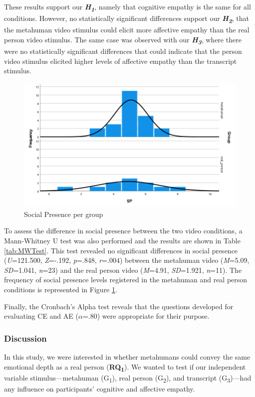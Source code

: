 These results support our \textbf{\textit{H\textsubscript{1}}}, namely that cognitive empathy is the same for all conditions. However, no statistically significant differences support our \textbf{\textit{H\textsubscript{2}}}, that the metahuman video stimulus could elicit more affective empathy than the real person video stimulus. The same case was observed with our \textbf{\textit{H\textsubscript{3}}}, where there were no statistically significant differences that could indicate that the person video stimulus elicited higher levels of affective empathy than the transcript stimulus.

\begin{figure}[!htb]
\includegraphics[width=\textwidth]{figures/MWSample.png}
\centering
\caption{Social Presence per group}
\label{fig:MWSample}
\end{figure}

To assess the difference in social presence between the two video conditions, a Mann-Whitney U test was also performed and the results are shown in Table \ref{tab:MWTest}. This test revealed no significant differences in social presence (\textit{U}=121.500, \textit{Z}=-.192, \textit{p}=.848, \textit{r}=.004) between the metahuman video (\textit{M}=5.09, \textit{SD}=1.041, \textit{n}=23) and the real person video (\textit{M}=4.91, \textit{SD}=1.921, \textit{n}=11). The frequency of social presence levels registered in the metahuman and real person conditions is represented in Figure \ref{fig:MWSample}.

Finally, the Cronbach's Alpha test reveals that the questions developed for evaluating CE and AE ($\alpha$=.80) were appropriate for their purpose.

\subsubsection{Discussion}
In this study, we were interested in whether metahumans could convey the same emotional depth as a real person (\textbf{RQ\textsubscript{1}}). We wanted to test if our independent variable stimulus---metahuman (G\textsubscript{1}), real person (G\textsubscript{2}), and transcript (G\textsubscript{3})---had any influence on participants' cognitive and affective empathy.

